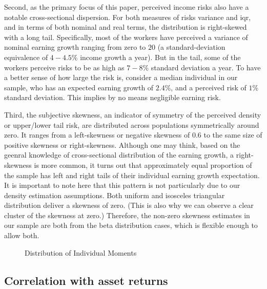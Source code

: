 \documentclass[12pt,notitlepage,onecolumn,aps,pra]{article}
\begin{document}
Second, as the primary focus of this paper, perceived income risks also
have a notable cross-sectional dispersion. For both measures of risks
variance and iqr, and in terms of both nominal and real terms, the
distribution is right-skewed with a long tail. Specifically, most of the
workers have perceived a variance of nominal earning growth ranging from
zero to \(20\) (a standard-deviation equivalence of \(4-4.5\%\) income
growth a year). But in the tail, some of the workers perceive risks to
be as high as \(7-8\%\) standard deviation a year. To have a better
sense of how large the risk is, consider a median individual in our
sample, who has an expected earning growth of \(2.4\%\), and a perceived
risk of \(1\%\) standard deviation. This implies by no means negligible
earning risk.

Third, the subjective skewness, an indicator of symmetry of the
perceived density or upper/lower tail risk, are distributed across
populations symmetrically around zero. It ranges from a left-skewness or
negative skewness of 0.6 to the same size of positive skewness or
right-skewness. Although one may think, based on the geenral knowledge
of cross-sectional distribution of the earning growth, a right-skewness
is more common, it turns out that approximately equal proportion of the
sample has left and right tails of their individual earning growth
expectation. It is important to note here that this pattern is not
particularly due to our density estimation assumptions. Both uniform and
isosceles triangular distribution deliver a skewness of zero. (This is
also why we can observe a clear cluster of the skewness at zero.)
Therefore, the non-zero skewness estimates in our sample are both from
the beta distribution cases, which is flexible enough to allow both.


    \begin{figure}[!ht]
        \begin{center}\end{center}
        \caption{Distribution of Individual Moments}
        \label{fig:histmoms}
    \end{figure}
    
    \hypertarget{correlation-with-asset-returns}{%
\subsection{Correlation with asset
returns}\label{correlation-with-asset-returns}}
\end{document}

